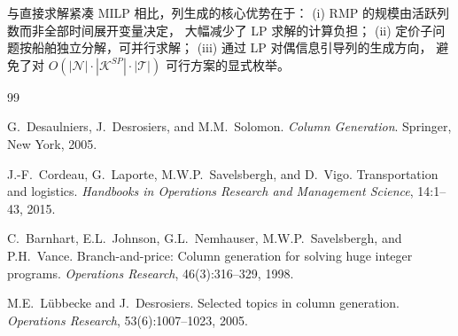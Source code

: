\documentclass[11pt,a4paper]{article}
\begin{document}
\noindent
与直接求解紧凑 MILP 相比，列生成的核心优势在于：
(i) RMP 的规模由活跃列数而非全部时间展开变量决定，
大幅减少了 LP 求解的计算负担；
(ii) 定价子问题按船舶独立分解，可并行求解；
(iii) 通过 LP 对偶信息引导列的生成方向，
避免了对 $O(|\mathcal{N}| \cdot |\mathcal{K}^{SP}| \cdot |\mathcal{T}|)$
可行方案的显式枚举。


\begin{thebibliography}{99}

G.~Desaulniers, J.~Desrosiers, and M.M.~Solomon.
\textit{Column Generation}.
Springer, New York, 2005.

J.-F.~Cordeau, G.~Laporte, M.W.P.~Savelsbergh, and D.~Vigo.
Transportation and logistics.
\textit{Handbooks in Operations Research and Management Science}, 14:1--43, 2015.

C.~Barnhart, E.L.~Johnson, G.L.~Nemhauser, M.W.P.~Savelsbergh, and P.H.~Vance.
Branch-and-price: Column generation for solving huge integer programs.
\textit{Operations Research}, 46(3):316--329, 1998.

M.E.~L\"ubbecke and J.~Desrosiers.
Selected topics in column generation.
\textit{Operations Research}, 53(6):1007--1023, 2005.

\end{thebibliography}
\end{document}
